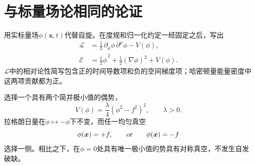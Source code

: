 \begin{classroomqa}
\end{classroomqa}

\begin{classroomqa}
\end{classroomqa}

\begin{classroomqa}
\end{classroomqa}

\section{与标量场论相同的论证}

用实标量场\(\phi(\bm{x},t)\)代替自旋。在度规和归一化约定一经固定之后，写出
\begin{equation}
\begin{aligned}
  \mathcal L
  &=\frac12\,\partial_\mu\phi\,\partial^\mu\phi-V(\phi),
  \\
  \mathcal E
  &=\frac12\dot\phi^{\,2}+\frac12(\nabla\phi)^2+V(\phi).
\end{aligned}
  \label{eq:l07-real-scalar}
\end{equation}
\(\mathcal L\)中的相对论性简写包含正的时间导数项和负的空间梯度项；哈密顿量能量密度中这两项贡献都为正。

选择一个具有两个简并极小值的偶势，
\begin{equation}
  V(\phi)=\frac{\lambda}{4}\left(\phi^2-f^2\right)^2,
  \qquad \lambda>0.
  \label{eq:l07-double-well}
\end{equation}
拉格朗日量在\(\phi\mapsto-\phi\)下不变，而任一均匀真空
\begin{equation}
  \phi(\bm{x})=+f,
  \qquad\hbox{or}\qquad
  \phi(\bm{x})=-f
\end{equation}
选择一侧。相比之下，在\(\phi=0\)处具有唯一极小值的势具有对称真空，不发生自发破缺。

